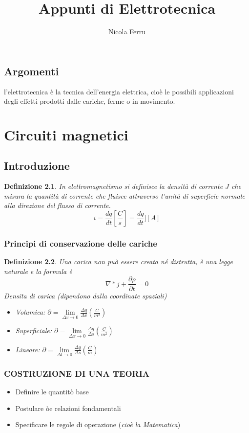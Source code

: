 \documentclass{book}
\title{Appunti di Elettrotecnica}
\author{Nicola Ferru}
\newtheorem{defi}{Definizione}
\begin{document}
\maketitle
\section{Argomenti}
l'elettrotecnica è la tecnica dell'energia elettrica, cioè le possibili applicazioni degli effetti prodotti
dalle cariche, ferme o in movimento.
\chapter{Circuiti magnetici}
\section{Introduzione}
\begin{defi}
  In elettromagnetismo si definisce la densità di corrente $J$ che misura la quantità di corrente
  che fluisce attraverso l'unità di superficie normale alla direzione del flusso di corrente.
  \begin{equation}
    i=\frac{dq}{dt}\left[\frac{C}{s}\right] = \frac{dq}{dt}][A]
  \end{equation}
\end{defi}
\subsection{Principi di conservazione delle cariche}
\begin{defi}
  Una carica non può essere creata né distrutta, è una legge neturale e la formula è
   \begin{equation}
	\nabla *j + \frac{\partial \rho}{\partial t}=0
   \end{equation}
   Densita di carica ({\it dipendono dalla coordinate spaziali})
   \begin{itemize}
   	\item Volumica: $\partial=\lim\limits_{\Delta v\to 0} \frac{\Delta q}{\Delta v}\left(\frac{C}{m^3}\right)$
     	\item Superficiale: $\partial=\lim\limits_{\Delta x\to 0} \frac{\Delta q}{\Delta s}\left(\frac{C}{m^2}\right)$
        \item Lineare: $\partial=\lim\limits_{\Delta l\to 0} \frac{\Delta q}{\Delta s}\left(\frac{C}{m}\right)$
   \end{itemize}
\end{defi}
\subsection{COSTRUZIONE DI UNA TEORIA}
\begin{itemize}
\item Definire le quantitò base
\item Postulare òe relazioni fondamentali
\item Specificare le regole di operazione
  ({\it cioè la Matematica})
\end{itemize}
\end{document}
